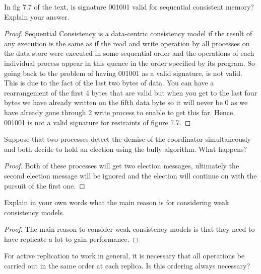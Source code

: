 \documentclass[12pt]{article}
\newenvironment{exercise}[2][Exercise]{\begin{trivlist}
\item[\hskip \labelsep {\bfseries #1}\hskip \labelsep {\bfseries #2.}]}{\end{trivlist}}
\begin{document}
\begin{exercise}{4}
In fig 7.7 of the text, is signature 001001 valid for sequential consistent memory? Explain your answer. 
\end{exercise}

\begin{proof}
Sequential Consistency is a data-centric consistency model if the result of any execution is the same as if the read and write operation by all processes on the data store were executed in some sequential order and the operations of each individual process appear in this quence in the order specified by its program. So going back to the problem of having 001001 as a valid signature, is not valid. This is due to the fact of the last two bytes of data. You can have a rearrangement of the first 4 bytes that are valid but when you get to the last four bytes we have already written on the fifth data byte so it will never be 0 as we have already gone through 2 write process to enable to get this far. Hence, 001001 is not a valid signature for restraints of figure 7.7.
\end{proof}

\begin{exercise}{5}
Suppose that two processes detect the demise of the coordinator simultaneously and both decide to hold an election using the bully algorithm. What happens?  
\end{exercise}

\begin{proof}
Both of these processes will get two election messages, ultimately the second election message will be ignored and the election will continue on with the pursuit of the first one. 
\end{proof}

\begin{exercise}{6}
Explain in your own words what the main reason is for considering weak consistency models. 
\end{exercise}

\begin{proof}
The main reason to consider weak consistency models is that they need to have replicate a lot to gain performance. 
\end{proof}

\begin{exercise}{7}
For active replication to work in general, it is necessary that all operations be carried out in the same order at each replica. Is this ordering always necessary?
\end{exercise}
\end{document}
